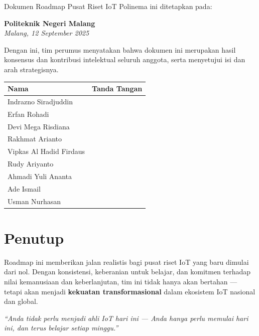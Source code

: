 \documentclass[11pt,a4paper]{article}
\begin{document}
Dokumen Roadmap Pusat Riset IoT Polinema ini ditetapkan pada:

\begin{center}
    \textbf{Politeknik Negeri Malang} \\
    \textit{Malang, 12 September 2025} \\
\end{center}

\noindent
Dengan ini, tim perumus menyatakan bahwa dokumen ini merupakan hasil konsensus dan kontribusi intelektual seluruh anggota, serta menyetujui isi dan arah strategisnya.

\vspace{2.2cm} %

\begin{tabular}{|p{5cm}|p{8cm}|}
    \hline
    \textbf{Nama}           & \textbf{Tanda Tangan} \\
    \hline
    Indrazno Siradjuddin    &                       \\[1.2cm] %
    \hline
    Erfan Rohadi            &                       \\[1.2cm]
    \hline
    Devi Mega Risdiana      &                       \\[1.2cm]
    \hline
    Rakhmat Arianto         &                       \\[1.2cm]
    \hline
    Vipkas Al Hadid Firdaus &                       \\[1.2cm]
    \hline
    Rudy Ariyanto           &                       \\[1.2cm]
    \hline
    Ahmadi Yuli Ananta      &                       \\[1.2cm]
    \hline
    Ade Ismail              &                       \\[1.2cm]
    \hline
    Usman Nurhasan          &                       \\[1.2cm]
    \hline
\end{tabular}

\vspace{2cm} %



\newpage

\section{Penutup}

Roadmap ini memberikan jalan realistis bagi pusat riset IoT yang baru dimulai dari nol. Dengan konsistensi, keberanian untuk belajar, dan komitmen terhadap nilai kemanusiaan dan keberlanjutan, tim ini tidak hanya akan bertahan — tetapi akan menjadi \textbf{kekuatan transformasional} dalam ekosistem IoT nasional dan global.

\textit{“Anda tidak perlu menjadi ahli IoT hari ini — Anda hanya perlu memulai hari ini, dan terus belajar setiap minggu.”}
\end{document}
